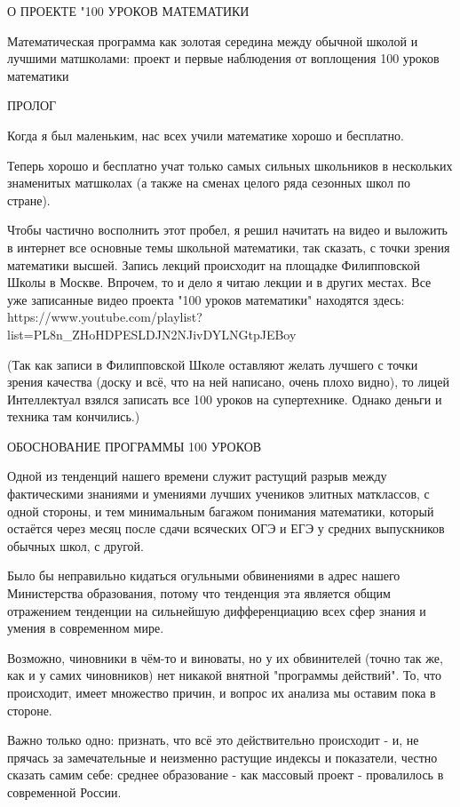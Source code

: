 О ПРОЕКТЕ "100 УРОКОВ МАТЕМАТИКИ

Математическая программа как золотая середина между
обычной школой и лучшими матшколами: проект и первые
наблюдения от воплощения 100 уроков математики

ПРОЛОГ

Когда я был маленьким, нас всех учили математике хорошо и бесплатно. 

Теперь хорошо и бесплатно учат только самых сильных школьников в нескольких 
знаменитых матшколах (а также на сменах целого ряда сезонных школ по стране). 

Чтобы частично восполнить этот пробел, я решил начитать на видео и выложить 
в интернет все основные темы школьной математики, так сказать, с точки зрения 
математики высшей. Запись лекций происходит на площадке Филипповской Школы 
в Москве. Впрочем, то и дело я читаю лекции и в других местах. Все уже записанные
видео проекта "100 уроков математики" находятся здесь:
https://www.youtube.com/playlist?list=PL8n_ZHoHDPESLDJN2NJivDYLNGtpJEBoy

(Так как записи в Филипповской Школе оставляют желать лучшего с точки зрения
качества (доску и всё, что на ней написано, очень плохо видно), то лицей Интеллектуал
взялся записать все 100 уроков на супертехнике. Однако деньги и техника там кончились.)

ОБОСНОВАНИЕ ПРОГРАММЫ 100 УРОКОВ

Одной из тенденций нашего времени служит растущий разрыв между фактическими
знаниями и умениями лучших учеников элитных матклассов, с одной стороны, и тем 
минимальным багажом понимания математики, который остаётся через месяц после 
сдачи всяческих ОГЭ и ЕГЭ у средних выпускников обычных школ, с другой.

Было бы неправильно кидаться огульными обвинениями в адрес нашего Министерства 
образования, потому что тенденция эта является общим отражением тенденции на 
сильнейшую дифференциацию всех сфер знания и умения в современном мире. 

Возможно, чиновники в чём-то и виноваты, но у их обвинителей (точно так же, как и 
у самих чиновников) нет никакой внятной "программы действий". То, что происходит, 
имеет множество причин, и вопрос их анализа мы оставим пока в стороне.

Важно только одно: признать, что всё это действительно происходит - и, не прячась
за замечательные и неизменно растущие индексы и показатели, честно сказать самим
себе: среднее образование - как массовый проект - провалилось в современной России.

